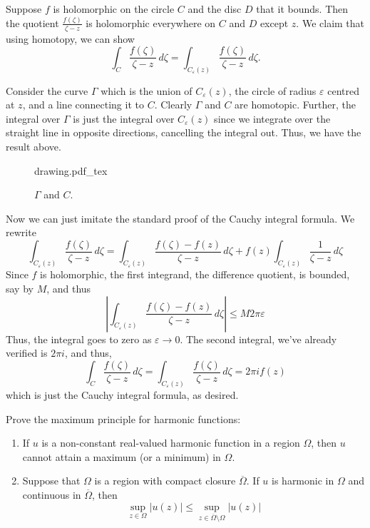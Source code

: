 \documentclass[12 pt, letterpaper]{hmcpset}
\newcommand{\incfig}[1]{%
    \def\svgwidth{0.7 \columnwidth}
    {#1.pdf_tex}
}
\begin{document}
\begin{solution}
	Suppose $f$ is holomorphic on the circle $C$ and the disc $D$ that it bounds. Then the quotient $\frac{f(\zeta)}{\zeta - z}$ is holomorphic everywhere on $C$ and $D$ except $z$. We claim that using homotopy, we can show
	\[
		\int_{C} \frac{f(\zeta)}{\zeta - z} \, d\zeta = \int_{C_{\varepsilon}(z)} \frac{f(\zeta)}{\zeta - z} \, d\zeta.
	\]

	Consider the curve $\Gamma$ which is the union of $C_{\varepsilon}(z)$, the circle of radius $\varepsilon$ centred at $z$, and a line connecting it to $C$. Clearly $\Gamma$ and $C$ are homotopic. Further, the integral over $\Gamma$ is just the integral over $C_{\varepsilon}(z)$ since we integrate over the straight line in opposite directions, cancelling the integral out. Thus, we have the result above.

\begin{figure}[H]
    \centering
    \incfig{drawing}
    \caption{$\Gamma$ and $C$.}
    \label{fig:parking-procedure}
\end{figure}

	Now we can just imitate the standard proof of the Cauchy integral formula. We rewrite
	\[
		\int_{C_{\varepsilon}(z)} \frac{f(\zeta)}{\zeta - z} \, d\zeta = \int_{C_{\varepsilon}(z)} \frac{f(\zeta) - f(z)}{\zeta - z} \, d\zeta + f(z) \int_{C_{\varepsilon}(z)} \frac{1}{\zeta - z} \, d\zeta 
	\]
	Since $f$ is holomorphic, the first integrand, the difference quotient, is bounded, say by $M$, and thus
	\[
		\left \lvert \int_{C_{\varepsilon}(z)} \frac{f(\zeta) - f(z)}{\zeta - z} \, d \zeta  \right \rvert \le M 2 \pi \varepsilon
	\]
	Thus, the integral goes to zero as $\varepsilon \to 0$. The second integral, we've already verified is $2 \pi i$, and thus,
	\[
		\int_{C} \frac{f(\zeta)}{\zeta - z} \, d\zeta = \int_{C_{\varepsilon}(z)} \frac{f(\zeta)}{\zeta - z} \, d\zeta = 2 \pi i f(z)
	\]
	which is just the Cauchy integral formula, as desired.
\end{solution}

\pagebreak

\begin{problem}[19.]
	Prove the maximum principle for harmonic functions:
	\begin{enumerate}
		\item If $u$ is a non-constant real-valued harmonic function in a region $\Omega$, then $u$ cannot attain a maximum (or a minimum) in $\Omega$.
		\item Suppose that $\Omega$ is a region with compact closure $\overline{\Omega}$. If $u$ is harmonic in $\Omega$ and continuous in $\overline{\Omega}$, then
			\[
				\sup_{z \in \Omega} \lvert u(z) \rvert \le \sup_{z \in \overline{\Omega} \setminus \Omega} \lvert u(z) \rvert
			\]
	\end{enumerate}
\end{problem}
\end{document}
